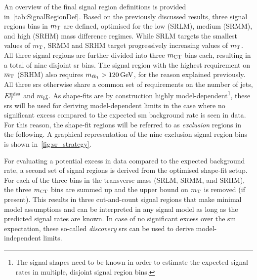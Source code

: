An overview of the final signal region definitions is provided in~\cref{tab:SignalRegionDef}. Based on the previously discussed results, three signal regions bins in $m_{\textrm{T}}$ are defined, optimised for the low (SRLM), medium (SRMM), and high (SRHM) mass difference regimes. While SRLM targets the smallest values of $m_{\textrm{T}}$, SRMM and SRHM target progressively increasing values of $m_{\textrm{T}}$. All three signal regions are further divided into three $m_{\textrm{CT}}$ bins each, resulting in a total of nine disjoint \gls{sr} bins. The signal region with the highest requirement on $m_{\textrm{T}}$ (SRHM) also requires $\mlb>\SI{120}{\GeV}$, for the reason explained previously. All three \glspl{sr} otherwise share a common set of requirements on the number of jets, $E_{\textrm{T}}^{\textrm{miss}}$ and $m_{b\bar{b}}$. As shape-fits are by construction highly model-dependent\footnote{The signal shapes need to be known in order to estimate the expected signal rates in multiple, disjoint signal region bins.}, these \glspl{sr} will be used for deriving model-dependent limits in the case where no significant excess compared to the expected \gls{sm} background rate is seen in data. For this reason, the shape-fit regions will be referred to as \textit{exclusion} regions in the following. A graphical representation of the nine exclusion signal region bins is shown in~\cref{fig:sr_strategy}.

For evaluating a potential excess in data compared to the expected background rate, a second set of signal regions is derived from the optimised shape-fit setup. For each of the three bins in the transverse mass (SRLM, SRMM, and SRHM), the three $m_{\textrm{CT}}$ bins are summed up and the upper bound on $m_{\textrm{T}}$ is removed (if present). This results in three cut-and-count signal regions that make minimal model assumptions and can be interpreted in any signal model as long as the predicted signal rates are known. In case of no significant excess over the \gls{sm} expectation, these so-called \textit{discovery} \glspl{sr} can be used to derive model-independent limits. 

